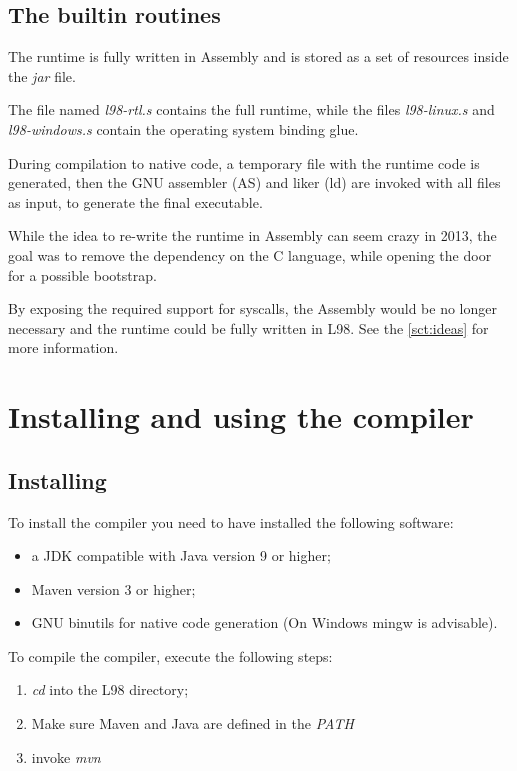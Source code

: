 \documentclass[a4paper, 11pt]{report}
\begin{document}
\section{The builtin routines}

The runtime is fully written in Assembly and is stored as a set of resources inside the \emph{jar}
file.

The file named \emph{l98-rtl.s} contains the full runtime, while the files \emph{l98-linux.s} and
\emph{l98-windows.s} contain the operating system binding glue.

During compilation to native code, a temporary file with the runtime code is generated, then the
GNU assembler (AS) and liker (ld) are invoked with all files as input, to generate the final executable.

While the idea to re-write the runtime in Assembly can seem crazy in 2013, the goal was to remove
the dependency on the C language, while opening the door for a possible bootstrap.

By exposing the required support for syscalls, the Assembly would be no longer necessary and the
runtime could be fully written in L98. See the \ref{sct:ideas} for more information.

\chapter{Installing and using the compiler}

\section{Installing}
  To install the compiler you need to have installed the following software:

\begin{itemize}  
\item a JDK compatible with Java version 9 or higher;
\item Maven version 3 or higher;
\item GNU binutils for native code generation (On Windows mingw is advisable).
\end{itemize}

To compile the compiler, execute the following steps:

\begin{enumerate}
\item \emph{cd} into the L98 directory;
\item Make sure Maven and Java are defined in the \emph{PATH}
\item invoke \emph{mvn}
\end{enumerate}
\end{document}
